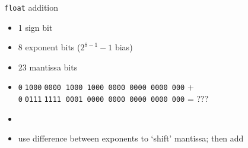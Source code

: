 \begin{frame}{\texttt{float} addition}
\begin{itemize}
\item 1 sign bit
\item 8 exponent bits ($2^{8-1}-1$ bias)
\item 23 mantissa bits
\vspace{.5cm}
\item {\fontsize{12}{13}\selectfont\texttt{0$\;$1000$\;$0000$\;\;$1000 1000 0000 0000 0000 000} + \\
      \texttt{0$\;$0111$\;$1111$\;\;$0001 0000 0000 0000 0000 000} = ???}
\item<2->
\iftoggle{heldback}{}{$1.10001_\text{TWO}\cdot2^1 + 1.0001\cdot2^0 = (11.0001+1.0001)\cdot2^0 = 100.0010\cdot2^0 = 4.125_\text{TEN}$}
\item<3-> use difference between exponents to `shift' mantissa; then add
\end{itemize}
\end{frame}
